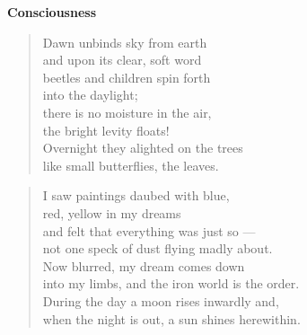 
\vspace*{-15mm}
\centeredornament
\vspace*{2mm}


\begin{center}
  \textbf{\large Consciousness}
\end{center}




\begin{verse}
  Dawn unbinds sky from earth \\
  and upon its clear, soft word \\
  beetles and children spin forth \\
  into the daylight; \\
  there is no moisture in the air, \\
  the bright levity floats! \\
  Overnight they alighted on the trees \\
  like small butterflies, the leaves.
\end{verse}

\bigskip





\begin{verse}
  I saw paintings daubed with blue, \\
  red, yellow in my dreams \\
  and felt that everything was just so ---\\
  not one speck of dust flying madly about. \\
  Now blurred, my dream comes down \\
  into my limbs, and the iron world is the order.\hspace*{-1mm} \\
  During the day a moon rises inwardly and, \\
  when the night is out, a sun shines herewithin.\hspace*{-1mm}
\end{verse}

